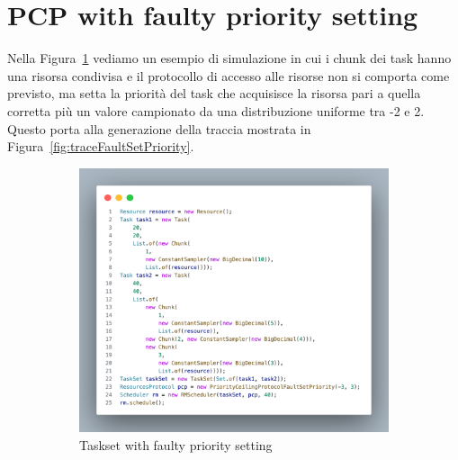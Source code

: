 \section{PCP with faulty priority setting}
Nella Figura~\ref{fig:tasksetFaultSetPriority} vediamo un esempio di simulazione in cui i chunk dei task hanno una risorsa condivisa e il protocollo di accesso alle risorse non si comporta come previsto, ma setta la priorità del task che acquisisce la risorsa pari a quella corretta più un valore campionato da una distribuzione uniforme tra -2 e 2. Questo porta alla generazione della traccia mostrata in Figura~\ref{fig:traceFaultSetPriority}.

\begin{figure}[htbp]
    \centering
    \begin{subfigure}{0.45\textwidth}
        \vfill
        \centering
        \includegraphics[width=.9\textwidth]{immagini/taskset fault set priority.pdf}
        \caption{Taskset with faulty priority setting}
        \label{fig:tasksetFaultSetPriority}
        \vfill
    \end{subfigure}
    \hfill
    \begin{subfigure}{0.45\textwidth}
        \vfill
        \centering
\end{subfigure}
\end{figure}
